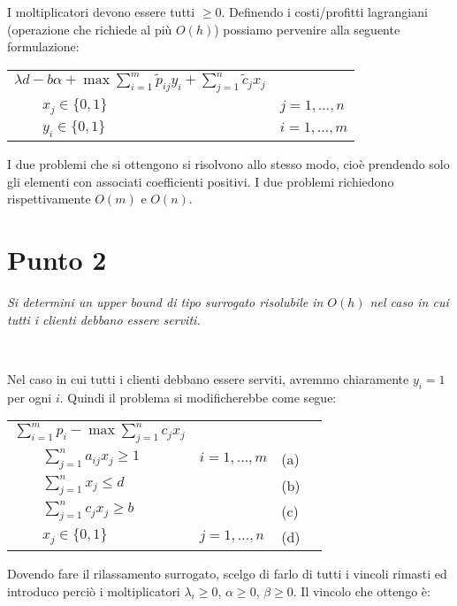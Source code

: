 \documentclass[11pt]{book}
\begin{document}
I moltiplicatori devono essere tutti $\geq 0$. Definendo i
costi/profitti lagrangiani (operazione che richiede al pi\`u $O(h)$)
possiamo pervenire alla seguente formulazione:

\begin{center}
\begin{tabular}{ll}
  $\lambda d - b \alpha + \max \sum\limits_{i=1}^m \tilde{p}_{ij}y_i +
  \sum\limits_{j=1}^n \tilde{c}_j x_j$\\
  $\qquad x_j \in \{0,1\}$ & $j=1,\dots,n$\\
  $\qquad y_i \in \{0,1\}$ & $i=1,\dots,m$\\
\end{tabular}
\end{center}

I due problemi che si ottengono si risolvono allo stesso modo, cio\`e
prendendo solo gli elementi con associati coefficienti positivi. I due
problemi richiedono rispettivamente $O(m)$ e $O(n)$.

\section*{Punto 2}

\textit{Si determini un upper bound di tipo surrogato risolubile in
  $O(h)$ nel caso in cui tutti i clienti debbano essere serviti.}

\

Nel caso in cui tutti i clienti debbano essere serviti, avremmo
chiaramente $y_i = 1$ per ogni $i$. Quindi il problema si
modificherebbe come segue:

\begin{center}
\begin{tabular}{llp{1cm}l}
$\sum\limits_{i=1}^m p_i - \max \sum\limits_{j=1}^n c_jx_j$\\
$\qquad \sum\limits_{j=1}^n a_{ij}x_j \geq 1$ & $i=1,\dots,m$ & (a)\\
$\qquad \sum\limits_{j=1}^n x_j \leq d$ & & (b) \\
$\qquad \sum\limits_{j=1}^n c_jx_j \geq b$ & & (c) \\
$\qquad x_j \in \{0,1\}$ & $j=1,\dots,n$ & (d) \\
\end{tabular}
\end{center}

Dovendo fare il rilassamento surrogato, scelgo di farlo di tutti i
vincoli rimasti ed introduco perci\`o i moltiplicatori $\lambda_i \geq
0$, $\alpha \geq 0$, $\beta \geq 0$. Il vincolo che ottengo \`e:
\end{document}
